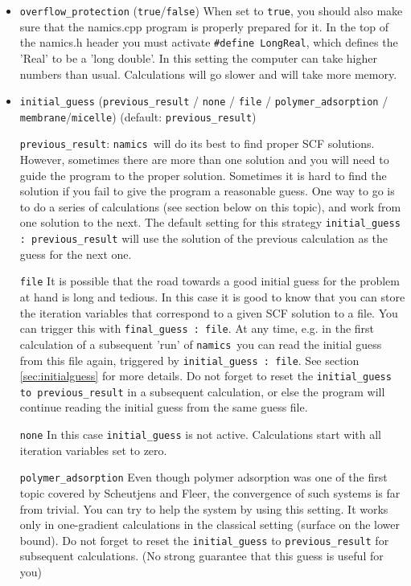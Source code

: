 \documentclass{article}
\newcommand{\namics}{{\tt namics}}
\begin{document}
\begin{itemize}
\item {\tt overflow\_protection} ({\tt true}/{\tt false}) When set to {\tt true}, you should also make sure that the namics.cpp program is properly prepared for it. In the top of the namics.h header you must activate {\tt \#define LongReal}, which defines the 'Real' to be a 'long double'. In this setting the computer can take higher numbers than usual. Calculations will go slower and will take more memory. 

\item {\tt initial\_guess} ({\tt previous\_result} / {\tt none} / {\tt file} / {\tt polymer\_adsorption} / {\tt membrane}/{\tt micelle}) (default: {\tt previous\_result}) 

{\tt previous\_result}: \namics\ will do its best to find proper SCF solutions. However, sometimes there are more than one solution and you will need to guide the program to the proper solution. Sometimes it is hard to find the solution if you fail to give the program a reasonable guess. One way to go is to do a series of calculations (see section below on this topic), and work from one solution to the next. The default setting for this strategy {\tt initial\_guess : previous\_result} will use the solution of the previous calculation as the guess for the next one. 

{\tt file} It is possible that the road towards a good initial guess for the problem at hand is long and tedious. In this case it is good to know that you can store the iteration variables that correspond to a given SCF solution to a file. You can trigger this with {\tt final\_guess : file}. At any time, e.g. in the first calculation of a subsequent 'run' of \namics\ you can read the initial guess from this file again, triggered by {\tt initial\_guess : file}. See section \ref{sec:initialguess} for more details. Do not forget to reset the {\tt initial\_guess to previous\_result} in a subsequent calculation, or else the program will continue reading the initial guess from the same guess file. 

{\tt none} In this case {\tt initial\_guess} is not active. Calculations start with all iteration variables set to zero. 

{\tt polymer\_adsorption} Even though polymer adsorption was one of the first topic covered by Scheutjens and Fleer, the convergence of such systems is far from trivial. You can try to help the system by using this setting. It works only in one-gradient calculations in the classical setting (surface on the lower bound). Do not forget to reset the {\tt initial\_guess} to {\tt previous\_result} for subsequent calculations. (No strong guarantee that this guess is useful for you)


\end{itemize}
\end{document}
